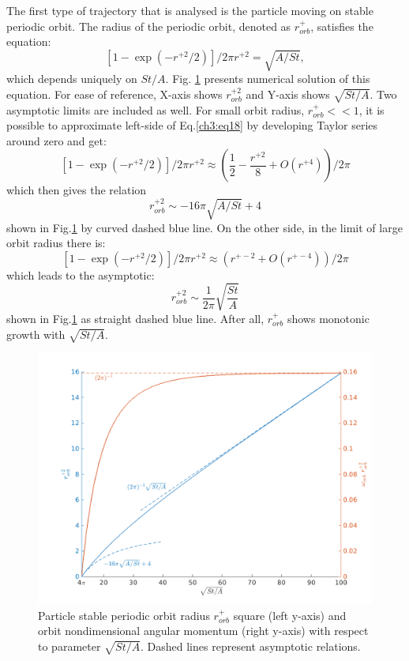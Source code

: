 \documentclass[../main.tex]{subfiles}
\begin{document}
The first type of trajectory that is analysed is the particle moving on stable periodic orbit. The radius of the periodic orbit, denoted as $r^+_{orb}$, satisfies the equation:
\begin{equation}
 \left[1-\exp\left( -r^{+ 2}/2 \right) \right]/2 \pi r^{+ 2}=\sqrt{A/St}, 
\label{ch3:eq18}
\end{equation}
which depends uniquely on $St/A$. Fig. \ref{fig:ch3_3} presents numerical solution of this equation. For ease of reference, X-axis shows $r^{+ 2}_{orb}$ and Y-axis shows $\sqrt{St/A}$. Two asymptotic limits are included as well. For small orbit radius, $r^+_{orb}<<1$, it is possible to approximate left-side of Eq.\ref{ch3:eq18} by developing Taylor series around zero and get:
\begin{equation}
 \left[1-\exp\left( -r^{+ 2}/2 \right) \right]/2 \pi r^{+ 2}\approx \left(\frac{1}{2}-\frac{r^{+ 2}}{8}+O(r^{+ 4})\right)/2 \pi
\label{ch3:eq18a}
\end{equation}
which then gives the relation
\begin{equation}
r^{+ 2}_{orb} \sim - 16 \pi \sqrt{A/St}+4
\label{ch3:eq18aa}
\end{equation}
shown in Fig.\ref{fig:ch3_3} by curved dashed blue line. On the other side, in the limit of large orbit radius there is:
\begin{equation}
\left[1-\exp\left( -r^{+ 2}/2 \right) \right]/2 \pi r^{+ 2}\approx \left(r^{+ -2}+O(r^{+ -4})\right) /2 \pi
\label{ch3:eq18b}
\end{equation}
which leads to the asymptotic:
\begin{equation}
r^{+ 2}_{orb} \sim \frac{1}{2\pi} \sqrt{\frac{St}{A}}
\label{ch3:eq18c}
\end{equation}
shown in Fig.\ref{fig:ch3_3} as straight dashed blue line. After all, $r^+_{orb}$ shows monotonic growth with $\sqrt{St/A}$.

\begin{figure}
\centering
\noindent \includegraphics[width=30pc]{gfx/r0_2_sqrt_St_A_omega_r0_2.png}
\caption{Particle stable periodic orbit radius $r^+_{orb}$ square (left y-axis) and orbit nondimensional angular momentum (right y-axis) with respect to parameter $\sqrt{St/A}$. Dashed lines represent asymptotic relations.}
\label{fig:ch3_3}
\end{figure}
\end{document}
